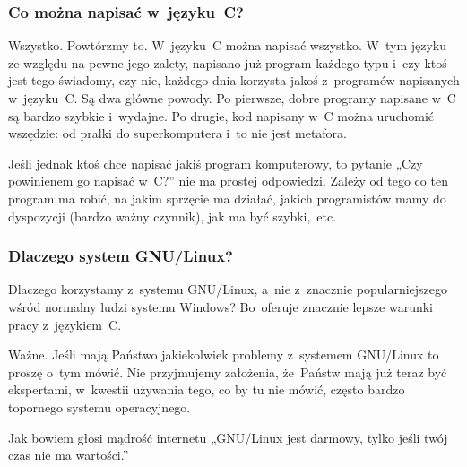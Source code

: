 \documentclass[10pt,t]{beamer}
\begin{document}
\begin{frame}
  \frametitle{Co można napisać w~języku~C?}


  Wszystko. Powtórzmy to. W~języku~C można napisać wszystko. W~tym języku ze
  względu na pewne jego zalety, napisano już program każdego typu i~czy
  ktoś jest tego świadomy, czy nie, każdego dnia korzysta jakoś z~programów
  napisanych w~języku~C. Są dwa główne powody. Po pierwsze, dobre programy
  napisane w~C są bardzo szybkie i~wydajne. Po drugie, kod napisany w~C
  można uruchomić wszędzie: od pralki do superkomputera i~to nie jest
  metafora.

  Jeśli jednak ktoś chce napisać jakiś program komputerowy, to pytanie
  „Czy powinienem go napisać w~C?” nie ma prostej odpowiedzi. Zależy od tego
  co ten program ma robić, na jakim sprzęcie ma działać, jakich programistów
  mamy do dyspozycji (bardzo ważny czynnik), jak ma być szybki,~etc.

\end{frame}





\begin{frame}
  \frametitle{Dlaczego system GNU/Linux?}


  Dlaczego korzystamy z~systemu GNU/Linux, a~nie z~znacznie
  popularniejszego wśród normalny ludzi systemu Windows? Bo~oferuje
  znacznie lepsze warunki pracy z~językiem~C.

  \alert{Ważne.} Jeśli mają Państwo jakiekolwiek problemy z~systemem
  GNU/Linux to proszę o~tym \alert{mówić}. Nie przyjmujemy założenia,
  że~Państw mają już teraz być ekspertami, w~kwestii używania tego, co by
  tu nie mówić, często bardzo topornego systemu operacyjnego.

  Jak bowiem głosi mądrość internetu „GNU/Linux jest darmowy, tylko jeśli
  twój czas nie ma wartości.”

\end{frame}
\end{document}
